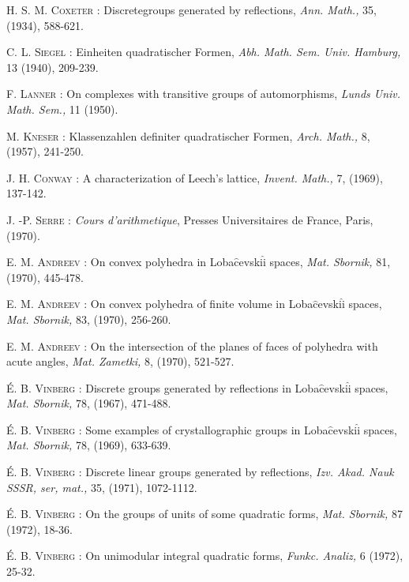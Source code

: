 \begin{thebibliography}{99}
 \textsc{H. S. M. Coxeter :} Discrete\pageoriginale groups generated by reflections, \textit{Ann. Math.,} 35, (1934), 588-621.

 \textsc{C. L. Siegel :} Einheiten quadratischer Formen, \textit{Abh. Math. Sem. Univ. Hamburg,} 13 (1940), 209-239.

 \textsc{F. Lanner :} On complexes with transitive groups of automorphisms, \textit{Lunds Univ. Math. Sem.,} 11 (1950).

 \textsc{M. Kneser :} Klassenzahlen definiter quadratischer Formen, \textit{Arch. Math.,} 8, (1957), 241-250.

 \textsc{J. H. Conway :} A characterization of Leech's lattice, \textit{Invent. Math., } 7, (1969), 137-142.

 \textsc{J. -P. Serre :} \textit{Cours d'arithmetique}, Presses Universitaires de France, Paris, (1970).

 \textsc{E. M. Andreev :} On convex polyhedra in Loba$\hat{\text{c}}$evski$\hat{\text{i}}$ spaces, \textit{Mat. Sbornik,} 81, (1970), 445-478.

 \textsc{E. M. Andreev :} On convex polyhedra of finite volume in Loba$\hat{\text{c}}$evski$\hat{\text{i}}$ spaces, \textit{Mat. Sbornik,} 83, (1970), 256-260.

 \textsc{E. M. Andreev :} On the intersection of the planes of faces of polyhedra with acute angles, \textit{Mat. Zametki,} 8, (1970), 521-527.

 \textsc{\'E. B. Vinberg :} Discrete groups generated by reflections in Loba$\hat{\text{c}}$evski$\hat{\text{i}}$ spaces, \textit{Mat. Sbornik,} 78, (1967), 471-488.

 \textsc{\'E. B. Vinberg :} Some examples of crystallographic groups in Loba$\hat{\text{c}}$evski$\hat{\text{i}}$ spaces, \textit{Mat. Sbornik,} 78, (1969), 633-639.

 \textsc{\'E. B. Vinberg :} Discrete linear groups generated by reflections, \textit{Izv. Akad. Nauk SSSR, ser, mat., } 35, (1971), 1072-1112.

 \textsc{\'E. B. Vinberg :} On the groups of units of some quadratic forms, \textit{Mat. Sbornik,}  87 (1972), 18-36.

 \textsc{\'E. B. Vinberg :} On unimodular integral quadratic forms, \textit{Funkc. Analiz, } 6 (1972), 25-32.
\end{thebibliography}
